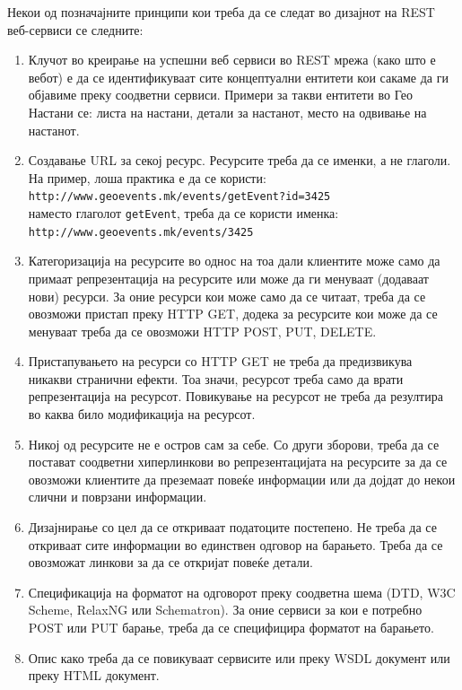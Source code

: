 Некои од позначајните принципи кои треба да се следат во дизајнот на REST
веб-сервиси се следните:
\begin{enumerate}
  \item Клучот во креирање на успешни веб сервиси во REST мрежа (како што е вебот) е
    да се идентификуваат сите концептуални ентитети кои сакаме да ги објавиме
    преку соодветни сервиси. Примери за такви ентитети во Гео Настани се: листа
    на настани, детали за настанот, место на одвивање на настанот.
    \item Создавање URL за секој ресурс. Ресурсите треба да се именки, а не глаголи. На
пример, лоша практика е да се користи:\\
 \texttt{http://www.geoevents.mk/events/getEvent?id=3425}\\ наместо глаголот
\texttt{getEvent}, треба да се користи именка:
\\\texttt{http://www.geoevents.mk/events/3425}\\
\item Категоризација на
ресурсите во однос на тоа дали клиентите може само да примаат репрезентација на
ресурсите или може да ги менуваат (додаваат нови) ресурси. За оние ресурси кои
може само да се читаат, треба да се овозможи пристап преку HTTP GET, додека за
ресурсите кои може да се менуваат треба да се овозможи HTTP POST, PUT, DELETE.
\item Пристапувањето на ресурси со HTTP GET не треба да предизвикува никакви странични
ефекти. Тоа значи, ресурсот треба само да врати репрезентација на ресурсот.
Повикување на ресурсот не треба да резултира во каква било модификација на ресурсот.
\item  Никој од ресурсите не е остров сам за себе. Со други зборови, треба да
се постават соодветни хиперлинкови во репрезентацијата на ресурсите за да се
овозможи клиентите да преземаат повеќе информации или да дојдат до некои слични
и поврзани информации. 
\item Дизајнирање со цел да се откриваат податоците постепено.
Не треба да се откриваат сите информации во единствен одговор на барањето. Треба
да се овозможат линкови за да се откријат повеќе детали. 
\item Спецификација на форматот на одговорот преку соодветна шема (DTD, W3C
Scheme, RelaxNG или Schematron). За оние сервиси за кои е потребно POST или PUT барање, треба да се
специфицира форматот на барањето. 
\item Опис како треба да се повикуваат сервисите или
преку WSDL документ или преку HTML документ.
\end{enumerate}
    
